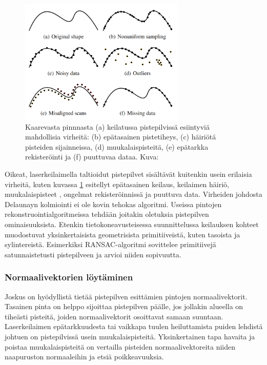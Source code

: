 \begin{figure}
    \centering
    \includegraphics[width=0.7\textwidth]{img/artifacts.png}
    \caption{Kaarevasta pinnnasta (a) keilatussa pistepilvissä esiintyviä mahdollisia virheitä: (b) epätasainen pistetiheys, (c) häiriötä pisteiden sijainneissa, (d) muukalaispisteitä, (e) epätarkka rekisteröinti ja (f) puuttuvaa dataa. Kuva: \cite{berger}}
    \label{img:artifacts}
\end{figure}

Oikeat, laserkeilaimella taltioidut pistepilvet sisältävät kuitenkin usein erilaisia virheitä, kuten kuvassa \ref{img:artifacts} esitellyt epätasainen keilaus, keilaimen häiriö, muukalaispisteet , ongelmat rekisteröinnissä ja puuttuva data. Virheiden johdosta Delaunayn kolmiointi ei ole kovin tehokas algoritmi. Useissa pintojen rekonstruointialgoritmeissa tehdään joitakin oletuksia pistepilven ominaisuuksista. Etenkin tietokoneavusteisessa suunnittelussa keilauksen kohteet muodostuvat yksinkertaisista geometrisista primitiiveistä, kuten tasoista ja sylintereistä. Esimerkiksi RANSAC-algoritmi \cite{ransac} sovittelee primitiivejä satunnaistetusti pistepilveen ja arvioi niiden sopivuutta. \cite{berger} 

\subsubsection{Normaalivektorien löytäminen}

Joskus on hyödyllistä tietää pistepilven esittämien pintojen normaalivektorit. Tasainen pinta on helppo sijoittaa pistepilven päälle, jos jollakin alueella on tiheästi pisteitä, joiden normaalivektorit osoittavat samaan suuntaan. Laserkeilaimen epätarkkuudesta tai vaikkapa tuulen heiluttamista puiden lehdistä johtuen on pistepilvissä usein muukalaispisteitä. Yksinkertainen tapa havaita ja poistaa muukalaispisteitä on vertailla pisteiden normaalivektoreita niiden naapuruston normaaleihin ja etsiä poikkeavuuksia. 

